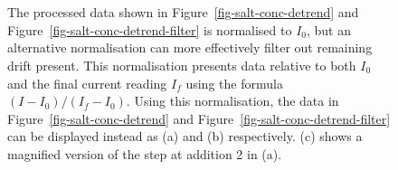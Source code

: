 \documentclass[
  a4paper,
]{scrbook}
\begin{document}
\begin{figure}
\begin{minipage}[t]{0.50\linewidth}
{}

\subcaption{\label{fig-salt-conc-detrend-filter-2}}
\end{minipage}%
\newline
\begin{minipage}[t]{0.28\linewidth}

{\centering 

~

}

\end{minipage}%
%
\begin{minipage}[t]{0.45\linewidth}

{\centering 


}

\subcaption{\label{fig-salt-conc-detrend-filter-single-step}}
\end{minipage}%
%
\begin{minipage}[t]{0.28\linewidth}

{\centering 

~

}

\end{minipage}%

\caption{\label{fig-salt-conc-sensing-2}The processed data shown in
Figure~\ref{fig-salt-conc-detrend} and
Figure~\ref{fig-salt-conc-detrend-filter} is normalised to \(I_{0}\),
but an alternative normalisation can more effectively filter out
remaining drift present. This normalisation presents data relative to
both \(I_{0}\) and the final current reading \(I_{f}\) using the formula
\((I - I_{0})/(I_{f} - I_{0})\). Using this normalisation, the data in
Figure~\ref{fig-salt-conc-detrend} and
Figure~\ref{fig-salt-conc-detrend-filter} can be displayed instead as
(a) and (b) respectively. (c) shows a magnified version of the step at
addition 2 in (a).}

\end{figure}
\end{document}
